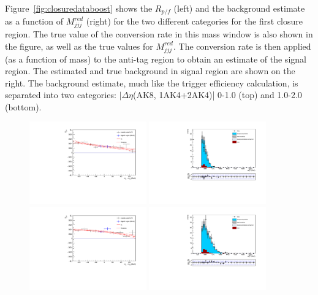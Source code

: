 Figure~\ref{fig:closuredataboost} shows the $R_{p/f}$ (left) and the background estimate as a function of $M_{jjj}^{red}$ (right) for the two different categories for the first closure region. The true value of the conversion rate in this mass window is also shown in the figure, as well as the true values for $M_{jjj}^{red}$. The conversion rate is then applied (as a function of mass) to the anti-tag region to obtain an estimate of the signal region. The estimated and true background in signal region are shown on the right. The background estimate, much like the trigger efficiency calculation, is separated into two categories: $|\Delta\eta$(AK8, 1AK4+2AK4)| 0-1.0 (top) and 1.0-2.0 (bottom).

\begin{figure}[h]
\centering
\includegraphics[width=0.45\textwidth]{F5/HH4b2p1SR_Fit_BG_boost_dEta0_CR1.pdf}
\includegraphics[width=0.45\textwidth]{F5/HH4b2p1_Plot_BG_boost_dEta0_CR1.pdf}\\
\includegraphics[width=0.45\textwidth]{F5/HH4b2p1SR_Fit_BG_boost_dEta1_CR1.pdf}
\includegraphics[width=0.45\textwidth]{F5/HH4b2p1_Plot_BG_boost_dEta1_CR1.pdf}

\end{figure}
